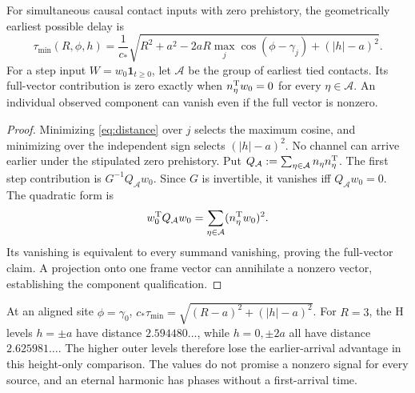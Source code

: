 \begin{proposition}\label{prop:onset}
For simultaneous causal contact inputs with zero prehistory, the geometrically earliest possible delay is
\begin{equation}\label{eq:onset}
\tau_{\min}(R,\phi,h)=\frac1{c_*}\sqrt{R^2+a^2-2aR\max_j\cos(\phi-\gamma_j)+(|h|-a)^2}.
\end{equation}
For a step input $W=w_0\mathbf1_{t\ge0}$, let $\mathcal A$ be the group of earliest tied contacts. Its full-vector contribution is zero exactly when $n_\eta^{\mathrm T} w_0=0$ for every $\eta\in\mathcal A$. An individual observed component can vanish even if the full vector is nonzero.
\end{proposition}
\begin{proof}
Minimizing \eqref{eq:distance} over $j$ selects the maximum cosine, and minimizing over the independent sign selects $(|h|-a)^2$. No channel can arrive earlier under the stipulated zero prehistory. Put $Q_{\mathcal A}:=\sum_{\eta\in\mathcal A}n_\eta n_\eta^{\mathrm T}$. The first step contribution is $G^{-1}Q_{\mathcal A}w_0$. Since $G$ is invertible, it vanishes iff $Q_{\mathcal A}w_0=0$. The quadratic form is
\[
w_0^{\mathrm T} Q_{\mathcal A}w_0=\sum_{\eta\in\mathcal A}(n_\eta^{\mathrm T} w_0)^2.
\]
Its vanishing is equivalent to every summand vanishing, proving the full-vector claim. A projection onto one frame vector can annihilate a nonzero vector, establishing the component qualification.
\end{proof}

At an aligned site $\phi=\gamma_0$, $c_*\tau_{\min}=\sqrt{(R-a)^2+(|h|-a)^2}$. For $R=3$, the H levels $h=\pm a$ have distance $2.594480\ldots$, while $h=0,\pm2a$ all have distance $2.625981\ldots$. The higher outer levels therefore lose the earlier-arrival advantage in this height-only comparison. The values do not promise a nonzero signal for every source, and an eternal harmonic has phases without a first-arrival time.

